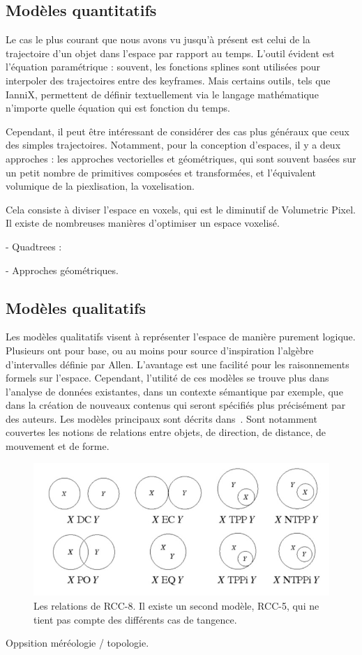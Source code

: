 \documentclass[french,12pt]{article}
\begin{document}
\subsection{Modèles quantitatifs}
Le cas le plus courant que nous avons vu jusqu'à présent est celui de la trajectoire d'un objet dans l'espace par rapport au temps.
L'outil évident est l'équation paramétrique : souvent, les fonctions splines sont utilisées pour interpoler 
des trajectoires entre des keyframes. Mais certains outils, tels que IanniX, permettent de définir textuellement
via le langage mathématique n'importe quelle équation qui est fonction du temps.

Cependant, il peut être intéressant de considérer des cas plus généraux que ceux des simples trajectoires. 
Notamment, pour la conception d'espaces, il y a deux approches : les approches vectorielles et géométriques, 
qui sont souvent basées sur un petit nombre de primitives composées et transformées, et l'équivalent 
volumique de la piexlisation, la voxelisation.

Cela consiste à diviser l'espace en voxels\cite{kaufman_volume_1993}, qui est le diminutif de Volumetric Pixel.
Il existe de nombreuses manières d'optimiser un espace voxelisé.


- Quadtrees : \cite{eppstein_skip_2008}

- Approches géométriques.

\subsection{Modèles qualitatifs}
Les modèles qualitatifs visent à représenter l'espace de manière purement logique. Plusieurs ont pour base, ou au moins pour source d'inspiration l'algèbre d'intervalles définie par Allen\cite{allen_towards_1984}. L'avantage est une facilité pour les raisonnements formels sur l'espace. Cependant, l'utilité de ces modèles se trouve plus dans l'analyse de données existantes, dans un contexte sémantique par exemple, que dans la création de nouveaux contenus qui seront spécifiés plus précisément par des auteurs. Les modèles principaux sont décrits dans~\cite{chen_survey_2015}. Sont notamment couvertes les notions de relations entre objets, de direction, de distance, de mouvement et de forme. 

\begin{figure}[h]
    \centering
    \includegraphics[scale=1]{images/rcc8.jpg}
    \caption{Les relations de RCC-8. Il existe un second modèle, RCC-5, qui ne tient pas compte des différents cas de tangence.}
    \label{fig.shapetape}
\end{figure}
Oppsition méréologie / topologie.
\end{document}
